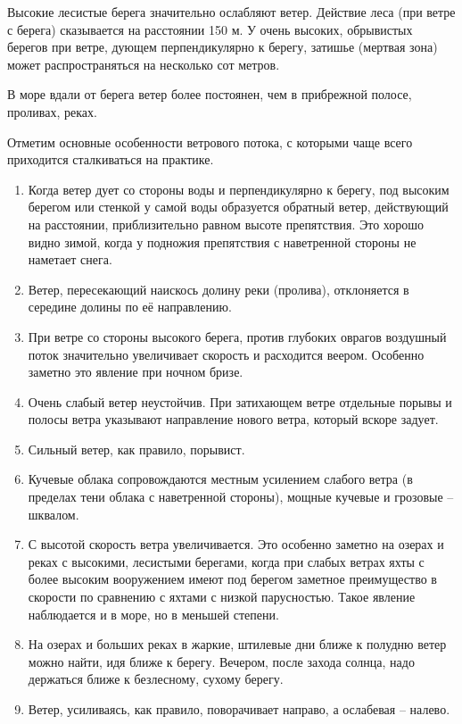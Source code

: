 \documentclass[a4paper, 12pt, twoside, final]{scrbook}
\begin{document}
Высокие лесистые берега значительно ослабляют ветер. Действие леса (при ветре с берега) сказывается на расстоянии 150 м. У очень высоких, обрывистых берегов при ветре, дующем перпендикулярно к берегу, затишье (мертвая зона) может распространяться на несколько сот метров.

В море вдали от берега ветер более постоянен, чем в прибрежной полосе, проливах, реках.

Отметим основные особенности ветрового потока, с которыми чаще всего приходится сталкиваться на практике.
\begin{enumerate}
\item Когда ветер дует со стороны воды и перпендикулярно к берегу, под высоким берегом или стенкой у самой воды образуется обратный ветер, действующий на расстоянии, приблизительно равном высоте препятствия. Это хорошо видно зимой, когда у подножия препятствия с наветренной стороны не наметает снега.
\item Ветер, пересекающий наискось долину реки (пролива), отклоняется в середине долины по её направлению.
\item При ветре со стороны высокого берега, против глубоких оврагов воздушный поток значительно увеличивает скорость и расходится веером. Особенно заметно это явление при ночном бризе.
\item Очень слабый ветер неустойчив. При затихающем ветре отдельные порывы и полосы ветра указывают направление нового ветра, который вскоре задует.
\item Сильный ветер, как правило, порывист.
\item Кучевые облака сопровождаются местным усилением слабого ветра (в пределах тени облака с наветренной стороны), мощные кучевые и грозовые \--- шквалом.
\item С высотой скорость ветра увеличивается. Это особенно заметно на озерах и реках с высокими, лесистыми берегами, когда при слабых ветрах яхты с более высоким вооружением имеют под берегом заметное преимущество в скорости по сравнению с яхтами с низкой парусностью. Такое явление наблюдается и в море, но в меньшей степени.
\item На озерах и больших реках в жаркие, штилевые дни ближе к полудню ветер можно найти, идя ближе к берегу. Вечером, после захода солнца, надо держаться ближе к безлесному, сухому берегу.
\item Ветер, усиливаясь, как правило, поворачивает направо, а ослабевая \--- налево.
\end{enumerate}
\end{document}
